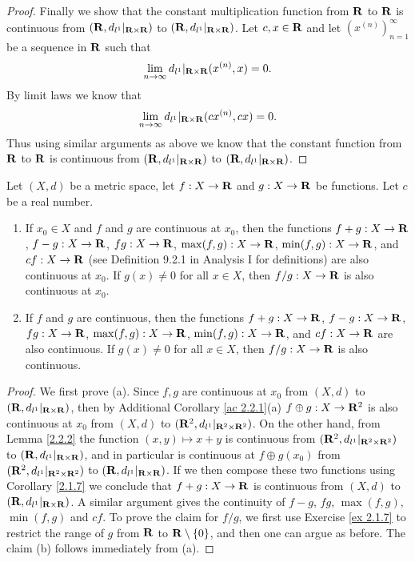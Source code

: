 \begin{proof}
    Finally we show that the constant multiplication function from \(\mathbf{R}\) to \(\mathbf{R}\) is continuous from \((\mathbf{R}, d_{l^1}|_{\mathbf{R} \times \mathbf{R}})\) to \((\mathbf{R}, d_{l^1}|_{\mathbf{R} \times \mathbf{R}})\).
    Let \(c, x \in \mathbf{R}\) and let \((x^{(n)})_{n = 1}^\infty\) be a sequence in \(\mathbf{R}\) such that
    \[
        \lim_{n \to \infty} d_{l^1}|_{\mathbf{R} \times \mathbf{R}}(x^{(n)}, x) = 0.
    \]
    By limit laws we know that
    \[
        \lim_{n \to \infty} d_{l^1}|_{\mathbf{R} \times \mathbf{R}}(cx^{(n)}, cx) = 0.
    \]
    Thus using similar arguments as above we know that the constant function from \(\mathbf{R}\) to \(\mathbf{R}\) is continuous from \((\mathbf{R}, d_{l^1}|_{\mathbf{R} \times \mathbf{R}})\) to \((\mathbf{R}, d_{l^1}|_{\mathbf{R} \times \mathbf{R}})\).
\end{proof}

\begin{corollary}\label{2.2.3}
    Let \((X, d)\) be a metric space, let \(f : X \to \mathbf{R}\) and \(g : X \to \mathbf{R}\) be functions.
    Let \(c\) be a real number.
    \begin{enumerate}
        \item If \(x_0 \in X\) and \(f\) and \(g\) are continuous at \(x_0\), then the functions \(f + g : X \to \mathbf{R}\), \(f - g : X \to \mathbf{R}\), \(fg : X \to \mathbf{R}\), \(\max(f, g) : X \to \mathbf{R}\), \(\min(f, g) : X \to \mathbf{R}\), and \(cf : X \to \mathbf{R}\) (see Definition 9.2.1 in Analysis I for definitions) are also continuous at \(x_0\).
              If \(g(x) \neq 0\) for all \(x \in X\), then \(f / g : X \to \mathbf{R}\) is also continuous at \(x_0\).
        \item If \(f\) and \(g\) are continuous, then the functions \(f + g : X \to \mathbf{R}\), \(f - g : X \to \mathbf{R}\), \(fg : X \to \mathbf{R}\), \(\max(f, g) : X \to \mathbf{R}\), \(\min(f, g) : X \to \mathbf{R}\), and \(cf : X \to \mathbf{R}\) are also continuous.
              If \(g(x) \neq 0\) for all \(x \in X\), then \(f / g : X \to \mathbf{R}\) is also continuous.
    \end{enumerate}
\end{corollary}

\begin{proof}
    We first prove (a). Since \(f, g\) are continuous at \(x_0\) from \((X, d)\) to \((\mathbf{R}, d_{l^1}|_{\mathbf{R} \times \mathbf{R}})\), then by Additional Corollary \ref{ac 2.2.1}(a) \(f \oplus g : X \to \mathbf{R}^2\) is also continuous at \(x_0\) from \((X, d)\) to \((\mathbf{R}^2, d_{l^1}|_{\mathbf{R}^2 \times \mathbf{R}^2})\).
    On the other hand, from Lemma \ref{2.2.2} the function \((x, y) \mapsto x + y\) is continuous from \((\mathbf{R}^2, d_{l^1}|_{\mathbf{R}^2 \times \mathbf{R}^2})\) to \((\mathbf{R}, d_{l^1}|_{\mathbf{R} \times \mathbf{R}})\), and in particular is continuous at \(f \oplus g(x_0)\) from \((\mathbf{R}^2, d_{l^1}|_{\mathbf{R}^2 \times \mathbf{R}^2})\) to \((\mathbf{R}, d_{l^1}|_{\mathbf{R} \times \mathbf{R}})\).
    If we then compose these two functions using Corollary \ref{2.1.7} we conclude that \(f + g : X \to \mathbf{R}\) is continuous from \((X, d)\) to \((\mathbf{R}, d_{l^1}|_{\mathbf{R} \times \mathbf{R}})\).
    A similar argument gives the continuity of \(f - g\), \(fg\), \(\max(f, g)\), \(\min(f, g)\) and \(cf\).
    To prove the claim for \(f / g\), we first use Exercise \ref{ex 2.1.7} to restrict the range of \(g\) from \(\mathbf{R}\) to \(\mathbf{R} \setminus \{0\}\), and then one can argue as before.
    The claim (b) follows immediately from (a).
\end{proof}

